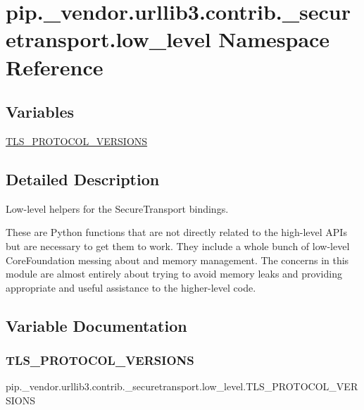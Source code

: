 \hypertarget{namespacepip_1_1__vendor_1_1urllib3_1_1contrib_1_1__securetransport_1_1low__level}{}\section{pip.\+\_\+vendor.\+urllib3.\+contrib.\+\_\+securetransport.\+low\+\_\+level Namespace Reference}
\label{namespacepip_1_1__vendor_1_1urllib3_1_1contrib_1_1__securetransport_1_1low__level}
\subsection*{Variables}
\begin{DoxyCompactItemize}
\item 
\hyperlink{namespacepip_1_1__vendor_1_1urllib3_1_1contrib_1_1__securetransport_1_1low__level_ac9ce55619dd28f642d72b0ac45176c93}{T\+L\+S\+\_\+\+P\+R\+O\+T\+O\+C\+O\+L\+\_\+\+V\+E\+R\+S\+I\+O\+NS}
\end{DoxyCompactItemize}


\subsection{Detailed Description}
\begin{DoxyVerb}Low-level helpers for the SecureTransport bindings.

These are Python functions that are not directly related to the high-level APIs
but are necessary to get them to work. They include a whole bunch of low-level
CoreFoundation messing about and memory management. The concerns in this module
are almost entirely about trying to avoid memory leaks and providing
appropriate and useful assistance to the higher-level code.
\end{DoxyVerb}
 

\subsection{Variable Documentation}
\mbox{\label{namespacepip_1_1__vendor_1_1urllib3_1_1contrib_1_1__securetransport_1_1low__level_ac9ce55619dd28f642d72b0ac45176c93}} 
\subsubsection{\texorpdfstring{T\+L\+S\+\_\+\+P\+R\+O\+T\+O\+C\+O\+L\+\_\+\+V\+E\+R\+S\+I\+O\+NS}{TLS\_PROTOCOL\_VERSIONS}}
{\footnotesize\ttfamily pip.\+\_\+vendor.\+urllib3.\+contrib.\+\_\+securetransport.\+low\+\_\+level.\+T\+L\+S\+\_\+\+P\+R\+O\+T\+O\+C\+O\+L\+\_\+\+V\+E\+R\+S\+I\+O\+NS}

